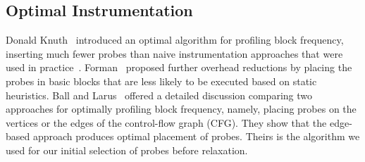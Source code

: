 



\subsection{Optimal Instrumentation}

Donald Knuth~\cite{knuth73} introduced an optimal algorithm for profiling block frequency, inserting much fewer probes than naive
instrumentation approaches that were used in practice~\cite{knuth71}. Forman~\cite{forman81} proposed further overhead reductions by
placing the probes in basic blocks that are less likely to be executed based on static heuristics. Ball and Larus~\cite{ball94} offered a
detailed discussion comparing two approaches for optimally profiling block frequency, namely, placing probes on the vertices or the edges
of the control-flow graph (CFG). They show that the edge-based approach produces optimal placement of probes. Theirs is the algorithm we
used for our initial selection of probes before relaxation.
